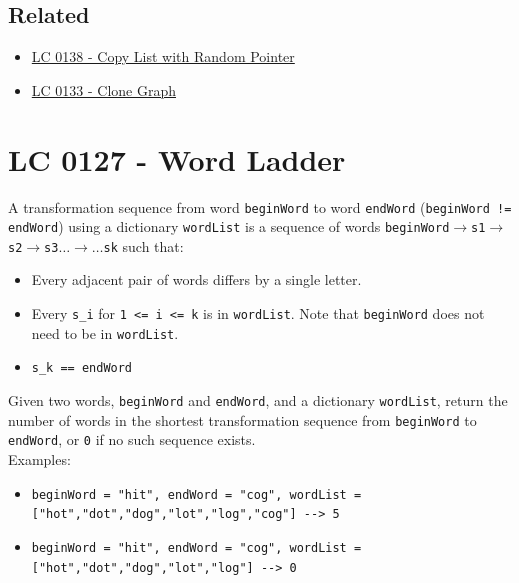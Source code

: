 \subsection*{Related}
\begin{itemize}
	\item \hyperref[lc0138]{LC 0138 - Copy List with Random Pointer}
	\item \hyperref[lc0133]{LC 0133 - Clone Graph}
\end{itemize}

\section{LC 0127 - Word Ladder}
A transformation sequence from word {\colorbox{CodeBackground}{\lstinline|beginWord|}} to word {\colorbox{CodeBackground}{\lstinline|endWord|}} ({\colorbox{CodeBackground}{\lstinline|beginWord != endWord|}}) using a dictionary {\colorbox{CodeBackground}{\lstinline|wordList|}} is a sequence of words {\colorbox{CodeBackground}{\lstinline|beginWord|}}$\rightarrow${\colorbox{CodeBackground}{\lstinline|s1|}}$\rightarrow${\colorbox{CodeBackground}{\lstinline|s2|}}$\rightarrow${\colorbox{CodeBackground}{\lstinline|s3|}}$\dots\rightarrow\dots${\colorbox{CodeBackground}{\lstinline|sk|}} such that:
\begin{itemize}
	\item Every adjacent pair of words differs by a single letter.
	\item Every {\colorbox{CodeBackground}{\lstinline|s_i|}} for {\colorbox{CodeBackground}{\lstinline|1 <= i <= k|}} is in {\colorbox{CodeBackground}{\lstinline|wordList|}}. Note that {\colorbox{CodeBackground}{\lstinline|beginWord|}} does not need to be in {\colorbox{CodeBackground}{\lstinline|wordList|}}.
	\item {\colorbox{CodeBackground}{\lstinline|s_k == endWord|}}
\end{itemize}
Given two words, {\colorbox{CodeBackground}{\lstinline|beginWord|}} and {\colorbox{CodeBackground}{\lstinline|endWord|}}, and a dictionary {\colorbox{CodeBackground}{\lstinline|wordList|}}, return the number of words in the shortest transformation sequence from {\colorbox{CodeBackground}{\lstinline|beginWord|}} to {\colorbox{CodeBackground}{\lstinline|endWord|}}, or {\colorbox{CodeBackground}{\lstinline|0|}} if no such sequence exists.\\

Examples:
\begin{itemize}
	\item {\colorbox{CodeBackground}{\lstinline|beginWord = "hit", endWord = "cog", wordList = ["hot","dot","dog","lot","log","cog"] --> 5|}}
	\item {\colorbox{CodeBackground}{\lstinline|beginWord = "hit", endWord = "cog", wordList = ["hot","dot","dog","lot","log"] --> 0|}}
\end{itemize}

